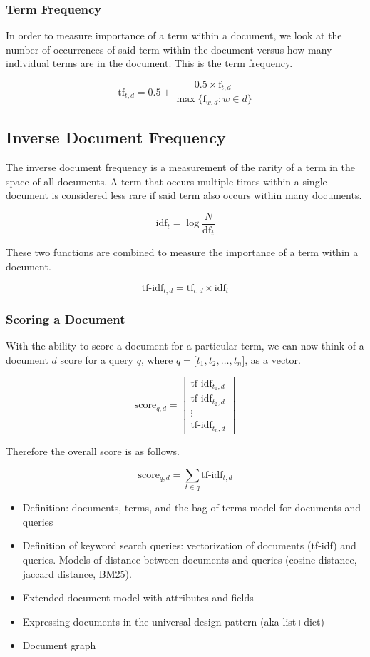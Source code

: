 		\subsubsection{Term Frequency}
			In order to measure importance of a term within a document, we look at the number of occurrences of said term within the document versus how many individual terms are in the document.  This is the term frequency.
			
			$$\mathrm{tf}_{t, d} = 0.5 + \frac{0.5 \times \mathrm{f}_{t, d}}{\max{\{\mathrm{f}_{w, d} : w \in d}\}}$$
			
		\subsection{Inverse Document Frequency}
			The inverse document frequency is a measurement of the rarity of a term in the space of all documents.  A term that occurs multiple times within a single document is considered less rare if said term also occurs within many documents.
			
			$$\mathrm{idf}_t = \log{\frac{N}{\mathrm{df}_t}}$$
		
		These two functions are combined to measure the importance of a term within a document.
		
		$$\textrm{tf-idf}_{t, d} = \mathrm{tf}_{t, d} \times \mathrm{idf}_t$$
		
		\subsubsection{Scoring a Document}
			With the ability to score a document for a particular term, we can now think of a document $d$ score for a query $q$, where $q = \lbrack t_1, t_2, \ldots, t_n\rbrack$, as a vector.
			
			$$
				\mathrm{score}_{q, d} = 
				\left[
				\begin{array}{c}
					\textrm{tf-idf}_{t_1, d} \\
					\textrm{tf-idf}_{t_2, d} \\
					\vdots \\
					\textrm{tf-idf}_{t_n, d}
				\end{array}
				\right]
			$$
			
			Therefore the overall score is as follows.
			
			$$\mathrm{score}_{q, d} = \sum_{t \in q} \textrm{tf-idf}_{t, d}$$
			
			
	
	\begin{itemize}
		\item Definition: documents, terms, and the bag of terms model for documents and queries
		\item Definition of keyword search queries: vectorization of documents (tf-idf) and queries.  Models of distance between documents and queries (cosine-distance, jaccard distance, BM25).
		\item Extended document model with attributes and fields
		\item Expressing documents in the universal design pattern (aka list+dict)
		\item Document graph
	\end{itemize}

